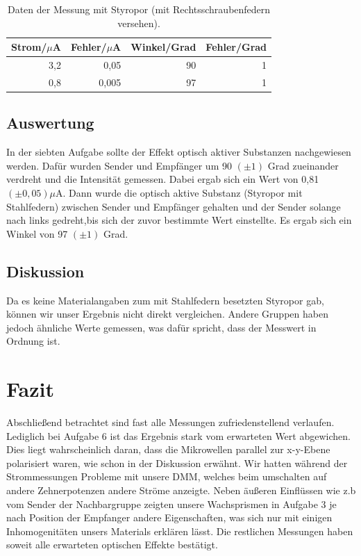 \documentclass[12pt]{scrartcl}
\begin{document}
\begin{table}[H]
\caption{Daten der Messung mit Styropor (mit Rechtsschraubenfedern versehen).}
\centering
\begin{tabular}{|r|r|r|r|}
\hline
\multicolumn{1}{|l|}{Strom/$\mu$A} & \multicolumn{1}{c|}{Fehler/$\mu$A} & \multicolumn{1}{l|}{Winkel/Grad} & \multicolumn{1}{l|}{Fehler/Grad} \\ \hline
3,2 & 0,05 & 90 & 1 \\ \hline
0,8 & 0,005 & 97 & 1 \\ \hline
\end{tabular}
\label{tab:a_7_m}
\end{table}
\subsection{Auswertung}
In der siebten Aufgabe sollte der Effekt optisch aktiver Substanzen nachgewiesen werden. Dafür wurden Sender und Empfänger um 90 $(\pm 1)$ Grad zueinander verdreht und die Intensität gemessen. Dabei ergab sich ein Wert von 0,81 $(\pm 0,05) \mu$A.  Dann wurde die optisch aktive Substanz (Styropor mit Stahlfedern) zwischen Sender und Empfänger gehalten und der Sender solange nach links gedreht,bis sich der zuvor bestimmte Wert einstellte. Es ergab sich ein Winkel von 97 $(\pm 1)$ Grad.
\subsection{Diskussion}
Da es keine Materialangaben zum mit Stahlfedern besetzten Styropor gab, können wir unser Ergebnis nicht direkt vergleichen. Andere Gruppen haben jedoch ähnliche Werte gemessen, was dafür spricht, dass der Messwert in Ordnung ist.
\section{Fazit}
Abschließend betrachtet sind fast alle Messungen zufriedenstellend verlaufen. Lediglich bei Aufgabe 6 ist das Ergebnis stark vom erwarteten Wert abgewichen. Dies liegt wahrscheinlich daran, dass die Mikrowellen parallel zur x-y-Ebene  polarisiert waren, wie schon in der Diskussion erwähnt.
Wir hatten während der Strommessungen Probleme mit unsere DMM, welches beim umschalten auf andere Zehnerpotenzen andere Ströme anzeigte.
Neben äußeren Einflüssen wie z.b vom Sender der Nachbargruppe zeigten unsere Wachsprismen in Aufgabe 3 je nach Position der Empfanger andere Eigenschaften, was sich nur mit einigen Inhomogenitäten unsers Materials erklären lässt. 
Die restlichen Messungen haben soweit alle erwarteten optischen Effekte bestätigt.

\end{document}
